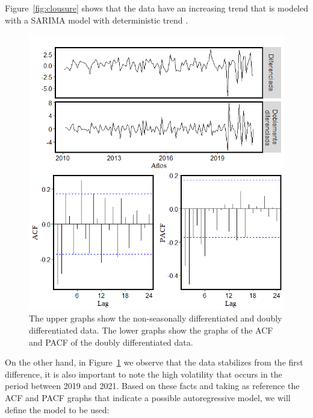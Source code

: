 Figure~\ref{fig:clousure} shows that the data have an increasing trend that is modeled with a SARIMA model with deterministic trend \citet{regresion}.
%
\begin{figure}
	\centering
	\includegraphics[scale=0.5]{Figs/b}
	\caption{The upper graphs show the non-seasonally differentiated and doubly differentiated data. The lower graphs show the graphs of the ACF and PACF of the doubly differentiated data.}
	\label{fig:acf2}
\end{figure}
%
On the other hand, in Figure~\ref{fig:acf2} we observe that the data stabilizes from the first difference, it is also important to note the high volatility that occurs in the period between 2019 and 2021. Based on these facts and taking as reference the ACF and PACF graphs that indicate a possible autoregressive model, we will define the model to be used:
